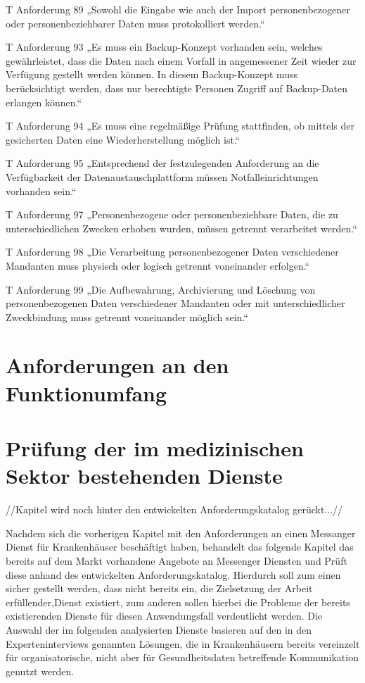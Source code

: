 T Anforderung 89
„Sowohl die Eingabe wie auch der Import personenbezogener oder personenbeziehbarer Daten muss protokolliert werden.“

T Anforderung 93
„Es muss ein Backup-Konzept vorhanden sein, welches gewährleistet, dass die Daten nach einem Vorfall in angemessener Zeit wieder zur Verfügung gestellt werden können. In diesem Backup-Konzept muss berücksichtigt werden, dass nur berechtigte Personen Zugriff auf Backup-Daten erlangen können.“

T Anforderung 94
„Es muss eine regelmäßige Prüfung stattfinden, ob mittels der gesicherten Daten eine Wiederherstellung möglich ist.“

T Anforderung 95
„Entsprechend der festzulegenden Anforderung an die Verfügbarkeit der Datenaustauschplattform müssen Notfalleinrichtungen vorhanden sein.“

T Anforderung 97
„Personenbezogene oder personenbeziehbare Daten, die zu unterschiedlichen Zwecken erhoben wurden, müssen getrennt verarbeitet werden.“

T Anforderung 98
„Die Verarbeitung personenbezogener Daten verschiedener Mandanten muss physisch oder logisch getrennt voneinander erfolgen.“

T Anforderung 99
„Die Aufbewahrung, Archivierung und Löschung von personenbezogenen Daten verschiedener Mandanten oder mit unterschiedlicher Zweckbindung muss getrennt voneinander möglich sein.“

\section{Anforderungen an den Funktionumfang}\label{section:pdimsbd}

\section{Prüfung der im medizinischen Sektor bestehenden Dienste}\label{section:pdimsbd}
//Kapitel wird noch hinter den entwickelten Anforderungskatalog gerückt...// 

Nachdem sich die vorherigen Kapitel mit den Anforderungen an einen Messanger Dienst für Krankenhäuser beschäftigt haben, behandelt das folgende Kapitel das bereits auf dem Markt vorhandene Angebote an Messenger Diensten und Prüft diese anhand des entwickelten Anforderungskatalog. Hierdurch soll zum einen sicher gestellt werden, dass nicht bereits ein, die Zielsetzung der Arbeit erfüllender,Dienst existiert, zum anderen sollen hierbei die Probleme der bereits existierenden Dienste für diesen Anwendungsfall verdeutlicht werden. Die Auswahl der im folgenden analysierten Dienste basieren auf den in den Experteninterviews genannten Lösungen, die in Krankenhäusern bereits vereinzelt für organisatorische, nicht aber für Gesundheitsdaten betreffende Kommunikation genutzt werden.

